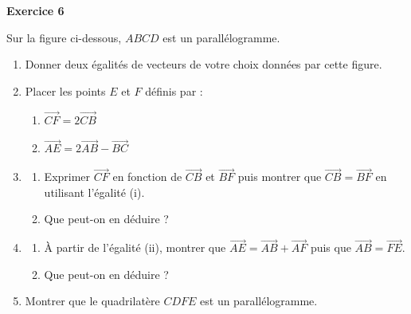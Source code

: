 \documentclass[a4paper,11pt]{article}
\newenvironment{exercice}[1]{%
  \par\bigskip\noindent\textbf{Exercice #1}\par\smallskip\noindent\ignorespaces
}{%
  \par
}
\begin{document}
\begin{exercice}{6}
Sur la figure ci-dessous, $ABCD$ est un parallélogramme.

\begin{center}
\end{center}

\begin{enumerate}[label=\arabic*.]
\item Donner deux égalités de vecteurs de votre choix données par cette figure.
\item Placer les points $E$ et $F$ définis par :
  \begin{enumerate}[label=(\roman*)]
  \item $\overrightarrow{CF}=2\overrightarrow{CB}$
  \item $\overrightarrow{AE}=2\overrightarrow{AB}-\overrightarrow{BC}$
  \end{enumerate}
\item
  \begin{enumerate}[label=\alph*.]
  \item Exprimer $\overrightarrow{CF}$ en fonction de $\overrightarrow{CB}$ et $\overrightarrow{BF}$ puis montrer que $\overrightarrow{CB}=\overrightarrow{BF}$ en utilisant l'égalité (i).
  \item Que peut-on en déduire ?
  \end{enumerate}
\item
  \begin{enumerate}[label=\alph*.]
  \item À partir de l'égalité (ii), montrer que $\overrightarrow{AE}=\overrightarrow{AB}+\overrightarrow{AF}$ puis que $\overrightarrow{AB}=\overrightarrow{FE}$.
  \item Que peut-on en déduire ?
  \end{enumerate}
\item Montrer que le quadrilatère $CDFE$ est un parallélogramme.
\end{enumerate}
\end{exercice}
\end{document}
